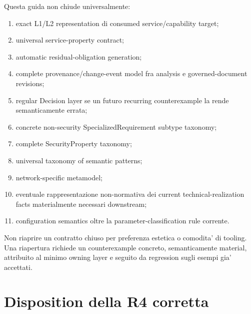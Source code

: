 \documentclass[11pt,a4paper]{article}
\begin{document}
Questa guida non chiude universalmente:
\begin{enumerate}[itemsep=0.08em,topsep=0.2em]
  \item exact L1/L2 representation di consumed service/capability target;
  \item universal service-property contract;
  \item automatic residual-obligation generation;
  \item complete provenance/change-event model fra analysis e governed-document revisions;
  \item regular Decision layer se un futuro recurring counterexample la rende semanticamente errata;
  \item concrete non-security SpecializedRequirement subtype taxonomy;
  \item complete SecurityProperty taxonomy;
  \item universal taxonomy of semantic patterns;
  \item network-specific metamodel;
  \item eventuale rappresentazione non-normativa dei current technical-realization facts materialmente necessari downstream;
  \item configuration semantics oltre la parameter-classification rule corrente.
\end{enumerate}

\begin{ddtacore}[title={Reopen rule}]
Non riaprire un contratto chiuso per preferenza estetica o comodita' di tooling. Una riapertura richiede un counterexample concreto, semanticamente material, attribuito al minimo owning layer e seguito da regression sugli esempi gia' accettati.
\end{ddtacore}

\section{Disposition della R4 corretta}
\end{document}
